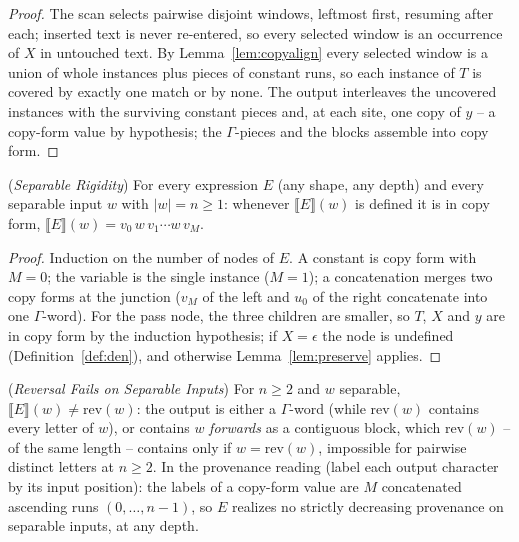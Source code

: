 \documentclass[runningheads,envcountsect]{llncs}
\begin{document}
\begin{proof}
    The scan selects pairwise disjoint windows, leftmost first, resuming after each; inserted text is never re-entered, so every selected window is an occurrence of $X$ in untouched text. By Lemma~\ref{lem:copyalign} every selected window is a union of whole instances plus pieces of constant runs, so each instance of $T$ is covered by exactly one match or by none. The output interleaves the uncovered instances with the surviving constant pieces and, at each site, one copy of $y$ -- a copy-form value by hypothesis; the $\Gamma$-pieces and the blocks assemble into copy form.
\end{proof}

\begin{theorem}
    (\emph{Separable Rigidity})
    \label{thm:separable}
    For every expression $E$ (any shape, any depth) and every separable input $w$ with $|w| = n \geq 1$: whenever $\llbracket E \rrbracket(w)$ is defined it is in copy form,
    $\llbracket E \rrbracket(w) = v_0\,w\,v_1 \cdots w\,v_M$.
\end{theorem}

\begin{proof}
    Induction on the number of nodes of $E$. A constant is copy form with $M = 0$; the variable is the single instance ($M = 1$); a concatenation merges two copy forms at the junction ($v_M$ of the left and $u_0$ of the right concatenate into one $\Gamma$-word). For the pass node, the three children are smaller, so $T$, $X$ and $y$ are in copy form by the induction hypothesis; if $X = \epsilon$ the node is undefined (Definition~\ref{def:den}), and otherwise Lemma~\ref{lem:preserve} applies.
\end{proof}

\begin{corollary}
    (\emph{Reversal Fails on Separable Inputs})
    \label{cor:norev}
    For $n \geq 2$ and $w$ separable, $\llbracket E \rrbracket(w) \neq \mathrm{rev}(w)$: the output is either a $\Gamma$-word (while $\mathrm{rev}(w)$ contains every letter of $w$), or contains $w$ \emph{forwards} as a contiguous block, which $\mathrm{rev}(w)$ -- of the same length -- contains only if $w = \mathrm{rev}(w)$, impossible for pairwise distinct letters at $n \geq 2$. In the provenance reading (label each output character by its input position): the labels of a copy-form value are $M$ concatenated ascending runs $(0, \dots, n{-}1)$, so $E$ realizes no strictly decreasing provenance on separable inputs, at any depth.
\end{corollary}
\end{document}
